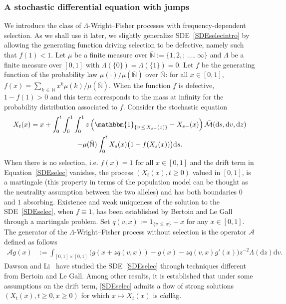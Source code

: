 \documentclass[10pt]{amsart}
\theoremstyle{definition}\newtheorem{defi}[theo]{Definition}\newtheorem{rema}[theo]{Remark}\newtheorem{exam}[theo]{Example}\newtheorem{exem}[theo]{Example}\newtheorem{nota}[theo]{Notation}
\newcommand{\ddr}{\mathrm{d}}
\newcommand{\bbmun}{\mathbbm{1}}
\newcommand{\bbN}{\mathbb{N}}
\newcommand{\clM}{\mathcal{M}}
\newcommand{\clA}{\mathcal{A}}
\begin{document}
\subsubsection{A stochastic differential equation with jumps} 

We introduce the class of $\Lambda$-Wright--Fisher processes with frequency-dependent selection. As we shall use it later, we slightly generalize SDE~\eqref{SDEselecintro} by allowing the generating function driving selection to be defective, namely such that $f(1)<1$. Let $\mu$ be a finite measure over $\bar{\bbN}:=\{1,2,;\,\ldots,\,\infty\}$ and $\Lambda$ be a finite measure over $[0,1]$ with $\Lambda(\{0\})=\Lambda(\{1\})=0$. Let $f$ be the generating function of the probability law $\mu(\cdot)/\mu(\bar{\bbN})$ over $\bar{\bbN}$: for all $x\in [0,1]$, $f(x)=\sum_{k\,\in\,\bbN}x^{k}\mu(k)/\mu(\bar{\bbN})$. When the function $f$ is defective, $1-f(1)>0$ and this term corresponds to the mass at infinity for the probability distribution associated to $f$. Consider the stochastic equation
\begin{multline}\label{SDEselec}
X_t(x)=x+\int_{0}^{t}\int_{0}^{1}\int_{0}^{1}z\left(\bbmun_{\left\{v\,\leq\,X_{s-}(x)\right\}}-X_{s-}(x)\right)\bar{\clM}(\ddr s,\ddr v, \ddr z)\\
-\mu(\bar{\bbN})\int_{0}^{t}X_{s}(x)\big(1-f(X_{s}(x))\big)\ddr s.
\end{multline}
When there is no selection, i.e. $f(x)=1$ for all $x\in [0,1]$ and the drift term in Equation~\eqref{SDEselec} vanishes, the process $(X_t(x),t\geq 0)$ valued in $[0,1]$, is a martingale (this property in terms of the population model can be thought as the neutrality assumption between the two alleles) and has both boundaries $0$ and $1$ absorbing. Existence and weak uniqueness of the solution to the SDE~\eqref{SDEselec}, when $f\equiv 1$, has been established by Bertoin and Le Gall~\cite{LGB2} through a martingale problem. Set $q(v,x):=1_{\{v\,\leq\,x\}}-x$ for any $x\in [0,1]$. The generator of the $\Lambda$-Wright--Fisher process without selection is the operator $\clA$ defined as follows
\begin{align}\label{generator}
\clA g(x)&:=\int_{[0,1]\times [0,1]}\big(g(x+zq(v,x))-g(x)-zq(v,x)g'(x)\big) z^{-2}\Lambda(\ddr z)\ddr v.
\end{align}
Dawson and Li~\cite{DawsonLi} have studied the SDE~\eqref{SDEselec} through techniques different from Bertoin and Le Gall. Among other results, it is established that under some assumptions on the drift term, \eqref{SDEselec} admits a flow of strong solutions $(X_t(x),t\geq 0,x\geq 0)$ for which $x\mapsto X_t(x)$ is càdlàg.
\end{document}
